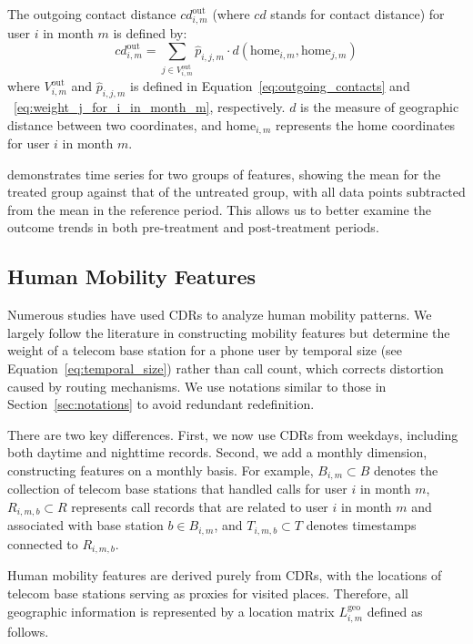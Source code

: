 \begin{definition}
The outgoing contact distance \( cd^{\text{out}}_{i, m} \) (where $cd$ stands for contact distance) for user $i$ in month $m$ is defined by:
\[
cd^{\text{out}}_{i, m}
=
\sum_{j \in V^{\text{out}}_{i, m} } \hat{p}_{i, j, m}
\cdot
d(\text{home}_{i, m}, \text{home}_{j, m})
\]
where $V^{\text{out}}_{i, m}$ and $\hat{p}_{i, j, m}$ is defined in Equation~\ref{eq:outgoing_contacts} and ~\ref{eq:weight_j_for_i_in_month_m}, respectively. $d$ is the measure of geographic distance between two coordinates, and $\text{home}_{i, m}$ represents the home coordinates for user $i$ in month $m$.
\end{definition}

 demonstrates time series for two groups of features, showing the mean for the treated group against that of the untreated group, with all data points subtracted from the mean in the reference period. This allows us to better examine the outcome trends in both pre-treatment and post-treatment periods.


\clearpage\newpage
\subsection{Human Mobility Features}
Numerous studies have used CDRs to analyze human mobility patterns. We largely follow the literature in constructing mobility features but determine the weight of a telecom base station for a phone user by temporal size (see Equation~\ref{eq:temporal_size}) rather than call count, which corrects distortion caused by routing mechanisms. We use notations similar to those in Section~\ref{sec:notations} to avoid redundant redefinition.

There are two key differences. First, we now use CDRs from weekdays, including both daytime and nighttime records. Second, we add a monthly dimension, constructing features on a monthly basis. For example, $B_{i, m} \subset B$ denotes the collection of telecom base stations that handled calls for user $i$ in month $m$, $R_{i, m, b} \subset R$ represents call records that are related to user $i$ in month $m$ and associated with base station $b \in B_{i, m}$, and $T_{i, m, b} \subset T$ denotes timestamps connected to $R_{i, m, b}$.

Human mobility features are derived purely from CDRs, with the locations of telecom base stations serving as proxies for visited places. Therefore, all geographic information is represented by a location matrix $L^{\text{geo}}_{i, m}$ defined as follows.

